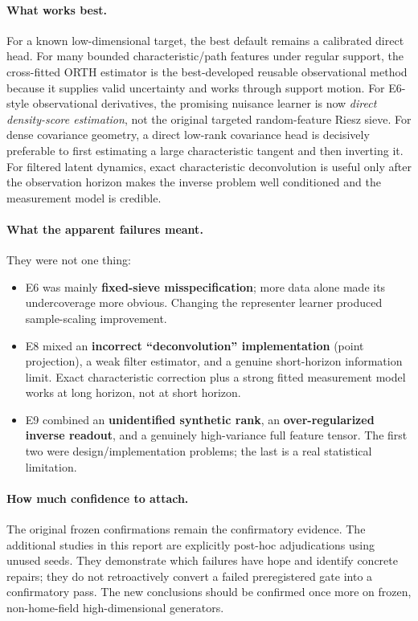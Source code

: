 \documentclass[10.5pt]{article}
\begin{document}
\paragraph{What works best.}
For a known low-dimensional target, the best default remains a calibrated direct head.  For many bounded characteristic/path features under regular support, the cross-fitted ORTH estimator is the best-developed reusable observational method because it supplies valid uncertainty and works through support motion.  For E6-style observational derivatives, the promising nuisance learner is now \emph{direct density-score estimation}, not the original targeted random-feature Riesz sieve.  For dense covariance geometry, a direct low-rank covariance head is decisively preferable to first estimating a large characteristic tangent and then inverting it.  For filtered latent dynamics, exact characteristic deconvolution is useful only after the observation horizon makes the inverse problem well conditioned and the measurement model is credible.

\paragraph{What the apparent failures meant.}
They were not one thing:
\begin{itemize}
\item E6 was mainly \textbf{fixed-sieve misspecification}; more data alone made its undercoverage more obvious.  Changing the representer learner produced sample-scaling improvement.
\item E8 mixed an \textbf{incorrect ``deconvolution'' implementation} (point projection), a weak filter estimator, and a genuine short-horizon information limit.  Exact characteristic correction plus a strong fitted measurement model works at long horizon, not at short horizon.
\item E9 combined an \textbf{unidentified synthetic rank}, an \textbf{over-regularized inverse readout}, and a genuinely high-variance full feature tensor.  The first two were design/implementation problems; the last is a real statistical limitation.
\end{itemize}

\paragraph{How much confidence to attach.}
The original frozen confirmations remain the confirmatory evidence.  The additional studies in this report are explicitly post-hoc adjudications using unused seeds.  They demonstrate which failures have hope and identify concrete repairs; they do not retroactively convert a failed preregistered gate into a confirmatory pass.  The new conclusions should be confirmed once more on frozen, non-home-field high-dimensional generators.
\end{document}
